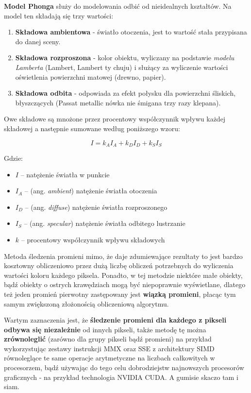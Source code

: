 \textbf{Model Phonga} służy do modelowania odbić od nieidealnych kształtów. Na model ten składają się trzy wartości:
\begin{enumerate}
	\item \textbf{Składowa ambientowa} - światło otoczenia, jest to wartość stała przypisana do danej sceny.
	\item \textbf{Składowa rozproszona} - kolor obiektu, wyliczany na podstawie \textit{modelu Lamberta} (Lambert, Lambert ty chuju) i służący za wyliczenie wartości oświetlenia powierzchni matowej (drewno, papier).
	\item \textbf{Składowa odbita} - odpowiada za efekt połysku dla powierzchni śliskich, błyszczących (Passat metallic nówka nie śmigana trzy razy klepana).
\end{enumerate}

Owe składowe są mnożone przez procentowy współczynnik wpływu każdej składowej a następnie sumowane według poniższego wzoru:

\begin{equation}
I = k_{A}I_{A} + k_{D}I_{D} + k_{S}I_{S}
\end{equation}

Gdzie:
\begin{itemize}
	\item $I$ – natężenie światła w punkcie
	\item $I_{A}$ – (ang. \textit{ambient}) natężenie światła otoczenia
    \item $I_{D}$ – (ang. \textit{diffuse}) natężenie światła rozproszonego
    \item $I_{S}$ – (ang. \textit{specular}) natężenie światła odbitego lustrzanie
	\item $k$ – procentowy współczynnik wpływu składowych
\end{itemize}

Metoda śledzenia promieni mimo, że daje zdumiewające rezultaty to jest bardzo kosztowny obliczeniowo przez dużą liczbę obliczeń potrzebnych do wyliczenia wartości koloru każdego piksela. Ponadto, w tej metodzie niektóre małe obiekty, bądź obiekty o ostrych krawędziach mogą być niepoprawnie wyświetlane, dlatego też jeden promień pierwotny zastępowany jest \textbf{wiązką promieni}, płacąc tym samym zwiększoną złożonością obliczeniową algorytmu.

Wartym zaznaczenia jest, że \textbf{śledzenie promieni dla każdego z pikseli odbywa się niezależnie} od innych pikseli, także metodę tę można \textbf{zrównoleglić} (zarówno dla grupy pikseli bądź promieni) na przykład wykorzystując zestawy instrukcji MMX oraz SSE z architektury SIMD równoleglące te same operacje arytmetyczne na liczbach całkowitych w procesorzem, bądź używając do tego celu dobrodziejstw najnowszych procesorów graficznych - na przykład technologia NVIDIA CUDA. A gumisie skaczo tam i siam.